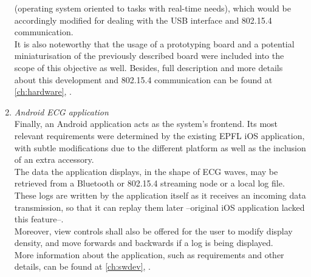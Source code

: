 \begin{enumerate}
				(operating system oriented to tasks with real-time needs), which would be accordingly modified
				for dealing with the USB interface and 802.15.4 communication.\\
				It is also noteworthy that the usage of a prototyping board and a potential miniaturisation of
				the previously described board were included into the scope of this objective as well. Besides, 
				full description and more details about this development and 802.15.4 communication can be found 
				at \autoref{ch:hardware}, .\\
			\item \emph{Android ECG application}\\
				Finally, an Android application acts as the system's frontend. Its most relevant requirements were
				determined by the existing EPFL iOS application, with subtle modifications due to the different
				platform as well as the inclusion of an extra accessory.\\
				The data the application displays, in the shape of ECG waves, may be retrieved from a Bluetooth
				or 802.15.4 streaming node or a local log file. These logs are written by the application itself
				as it receives an incoming data transmission, so that it can replay them later --original
				iOS application lacked this feature--.\\
				Moreover, view controls shall also be offered for the user to modify display density, and move
				forwards and backwards if a log is being displayed.\\
				More information about the application, such as requirements and other details, can be found
				at \autoref{ch:swdev}, .\\
		\end{enumerate}
		
